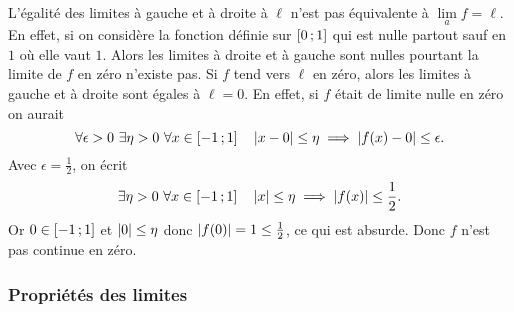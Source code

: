 L'égalité des limites à gauche et à droite à $\ell$ n'est pas équivalente à $\lim\limits_{a}f=\ell$. En effet, si on considère la fonction définie sur $\left[ 0 \, ;  1 \right]$ qui est nulle partout sauf en $1$ où elle vaut $1$. Alors les limites à droite et à gauche sont nulles pourtant la limite de $f$ en zéro n'existe pas. Si $f$ tend vers $\ell$ en zéro, alors les limites à gauche et à droite sont égales à $\ell=0$. En effet, si $f$ était de limite nulle en zéro on aurait
\begin{equation}
  \forall \epsilon > 0 \ \exists \eta > 0 \ \forall x \in \intervalleff{-1}{1} \quad \abs{x-0} \leq \eta \implies \abs{f(x)-0} \leq \epsilon.
\end{equation}
Avec $\epsilon=\frac{1}{2}$, on écrit
\begin{equation}
  \exists \eta > 0 \ \forall x \in \left[ -1 \, ;  1 \right] \quad \left\lvert x\right\rvert\leq \eta \implies \left\lvert f(x)\right\rvert \leq \frac{1}{2}.
\end{equation}
Or $0 \in \left[ -1 \, ;  1 \right]$ et $\left\lvert0\right\rvert\leq \eta$ donc $\left\lvert f(0)\right\rvert=1 \leq \frac{1}{2}$, ce qui est absurde. Donc $f$ n'est pas continue en zéro.

\subsubsection{Propriétés des limites}


